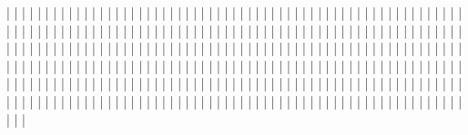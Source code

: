 |   |               |
|   |               |
|   |               |
|   |               |
|   |               |
|   |               |
|   |               |
|   |               |
|   |               |
|   |               |
|   |               |
|   |               |
|   |               |
|   |               |
|   |               |
|   |               |
|   |               |
|   |               |
|   |               |
|   |               |
|   |               |
|   |               |
|   |               |
|   |               |
|   |               |
|   |               |
|   |               |
|   |               |
|   |               |
|   |               |
|   |               |
|   |               |
|   |               |
|   |               |
|   |               |
|   |               |
|   |               |
|   |               |
|   |               |
|   |               |
|   |               |
|   |               |
|   |               |
|   |               |
|   |               |
|   |               |
|   |               |
|   |               |
|   |               |
|   |               |
|   |               |
|   |               |
|   |               |
|   |               |
|   |               |
|   |               |
|   |               |
|   |               |
|   |               |
|   |               |
|   |               |
|   |               |
|   |               |
|   |               |
|   |               |
|   |               |
|   |               |
|   |               |
|   |               |
|   |               |
|   |               |
|   |               |
|   |               |
|   |               |
|   |               |
|   |               |
|   |               |
|   |               |
|   |               |
|   |               |
|   |               |
|   |               |
|   |               |
|   |               |
|   |               |
|   |               |
|   |               |
|   |               |
|   |               |
|   |               |
|   |               |
|   |               |
|   |               |
|   |               |
|   |               |
|   |               |
|   |               |
|   |               |
|   |               |
|   |               |
|   |               |
|   |               |
|   |               |
|   |               |
|   |               |
|   |               |
|   |               |
|   |               |
|   |               |
|   |               |
|   |               |
|   |               |
|   |               |
|   |               |
|   |               |
|   |               |
|   |               |
|   |               |
|   |               |

